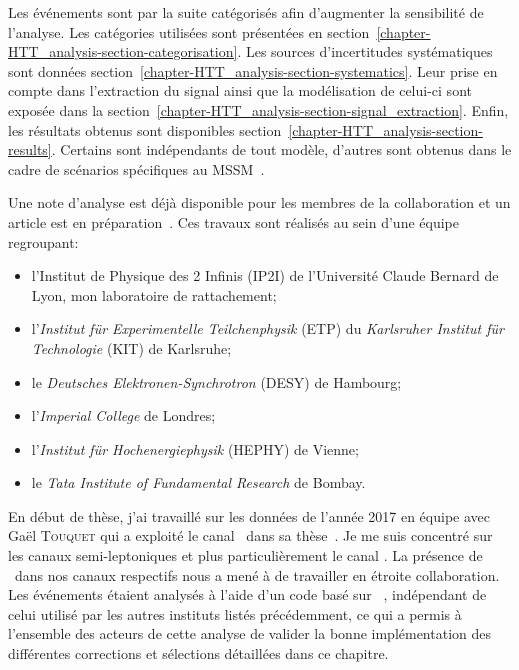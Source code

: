 Les événements sont par la suite catégorisés afin d'augmenter la sensibilité de l'analyse.
Les catégories utilisées sont présentées en section~\ref{chapter-HTT_analysis-section-categorisation}.
Les sources d'incertitudes systématiques sont données section~\ref{chapter-HTT_analysis-section-systematics}.
Leur prise en compte dans l'extraction du signal ainsi que la modélisation de celui-ci sont exposée dans la section~\ref{chapter-HTT_analysis-section-signal_extraction}.
Enfin, les résultats obtenus sont disponibles section~\ref{chapter-HTT_analysis-section-results}.
Certains sont indépendants de tout modèle, d'autres sont obtenus dans le cadre de scénarios spécifiques au MSSM~\cite{Bagnaschi_2019}.
\par
Une note d'analyse \cite{CMS-NOTE-2020-218} est déjà disponible pour les membres de la collaboration et un article est en préparation~\cite{HIG-21-001}.
Ces travaux sont réalisés au sein d'une équipe regroupant:
\begin{itemize}
\item l'Institut de Physique des 2 Infinis (IP2I) de l'Université Claude Bernard de Lyon, mon laboratoire de rattachement;
\item l'\emph{Institut für Experimentelle Teilchenphysik} (ETP) du \emph{Karlsruher Institut für Technologie} (KIT) de Karlsruhe;
\item le \emph{Deutsches Elektronen-Synchrotron} (DESY) de Hambourg;
\item l'\emph{Imperial College} de Londres;
\item l'\emph{Institut für Hochenergiephysik} (HEPHY)
 de Vienne;
\item le \emph{Tata Institute of Fundamental Research} de Bombay.
\end{itemize}
\par
En début de thèse, j'ai travaillé sur les données de l'année 2017 en équipe avec Gaël \textsc{Touquet} qui a exploité le canal \tauh\tauh\ dans sa thèse~\cite{Gael_thesis}.
Je me suis concentré sur les  canaux semi-leptoniques et plus particulièrement le canal \mu\tauh.
La présence de \tauh\ dans nos canaux respectifs nous a mené à de travailler en étroite collaboration.
Les événements étaient analysés à l'aide d'un code basé sur \HEPPY~\cite{heppy},
indépendant de celui utilisé par les autres instituts listés précédemment,
ce qui a permis à l'ensemble des acteurs de cette analyse de valider la bonne implémentation des différentes corrections et sélections détaillées dans ce chapitre.
